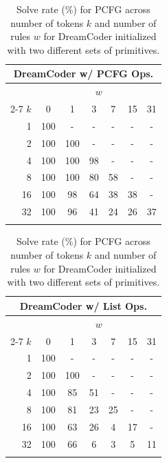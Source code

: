 \begin{table}

\parbox{.32\linewidth}{
    \small
    \setlength\tabcolsep{3.5pt}
    \centering
    \begin{tabular}{@{}rcccccc@{}}
    \multicolumn{7}{c}{DreamCoder w/ PCFG Ops.} \\
    \toprule
    & \multicolumn{6}{c}{$w$} \\
    \cmidrule(lr){2-7}
    $k$&0&1&3&7&15&31 \\
    \midrule
     1& 100 & - & - & - & - & -       \\
     2& 100 & 100 & - & - & - & -     \\
     4& 100 & 100 & 98 & - & - & -    \\
     8& 100 & 100 & 80 & 58 & - & -   \\
    16& 100 & 98 & 64 & 38 & 38 & -   \\
    32& 100 & 96 & 41 & 24 & 26 & 37  \\
    \bottomrule
    \vspace{-0.5em}
    \end{tabular}
    \vspace{-1.0em}
}
\parbox{.32\linewidth}{
    \small
    \setlength\tabcolsep{3.5pt}
    \centering
    \begin{tabular}{@{}rcccccc@{}}
    \multicolumn{7}{c}{DreamCoder w/ List Ops.} \\
    \toprule
    & \multicolumn{6}{c}{$w$} \\
    \cmidrule(lr){2-7}
    $k$&0&1&3&7&15&31 \\
    \midrule
     1& 100 & - & - & - & - &    -  \\
     2& 100 & 100 & - & - & - &  -  \\
     4& 100 & 85 & 51 & - & - &  -  \\
     8& 100 & 81 & 23 & 25 & - & -  \\
    16& 100 & 63 & 26 & 4 & 17 & -  \\
    32& 100 & 66 & 6 & 3 & 5 & 11  \\
    \bottomrule
    \vspace{-0.5em}
    \end{tabular}
    \vspace{-1.0em}
    \caption{
    \small
    Solve rate (\%) for PCFG across number of tokens $k$ and number of rules $w$ for DreamCoder initialized with two different sets of primitives.}
    \label{tab:pcfg-results-kw-rebuttal}
}

\end{table}



